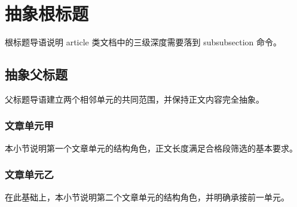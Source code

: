 \documentclass{article}
\begin{document}
\section{抽象根标题}
根标题导语说明 article 类文档中的三级深度需要落到 subsubsection 命令。

\subsection{抽象父标题}
父标题导语建立两个相邻单元的共同范围，并保持正文内容完全抽象。

\subsubsection{文章单元甲}
本小节说明第一个文章单元的结构角色，正文长度满足合格段筛选的基本要求。

\subsubsection{文章单元乙}
在此基础上，本小节说明第二个文章单元的结构角色，并明确承接前一单元。
\end{document}
